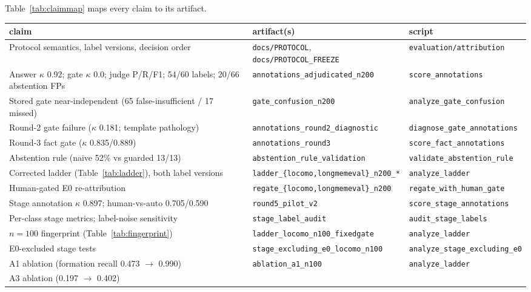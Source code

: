 \documentclass[11pt]{article}
\begin{document}
Table~\ref{tab:claimmap} maps every claim to its artifact.

\begin{table}[p]
\centering
\footnotesize
\setlength{\tabcolsep}{4pt}
\begin{tabular}{@{}p{6.0cm}p{5.4cm}p{4.0cm}@{}}
\toprule
claim & artifact(s) & script \\
\midrule
Protocol semantics, label versions, decision order &
\texttt{docs/PROTOCOL}, \texttt{docs/PROTOCOL\_FREEZE} &
\texttt{evaluation/attribution} \\
Answer $\kappa$ 0.92; gate $\kappa$ 0.0; judge P/R/F1; 54/60 labels; 20/66
abstention FPs & \texttt{annotations\_adjudicated\_n200} &
\texttt{score\_annotations} \\
Stored gate near-independent (65 false-insufficient / 17 missed) &
\texttt{gate\_confusion\_n200} & \texttt{analyze\_gate\_confusion} \\
Round-2 gate failure ($\kappa$ 0.181; template pathology) &
\texttt{annotations\_round2\_diagnostic} &
\texttt{diagnose\_gate\_annotations} \\
Round-3 fact gate ($\kappa$ 0.835/0.889) &
\texttt{annotations\_round3} & \texttt{score\_fact\_annotations} \\
Abstention rule (naive 52\% vs guarded 13/13) &
\texttt{abstention\_rule\_validation} & \texttt{validate\_abstention\_rule} \\
Corrected ladder (Table~\ref{tab:ladder}), both label versions &
\texttt{ladder\_\{locomo,longmemeval\}\_n200\_*} & \texttt{analyze\_ladder} \\
Human-gated E0 re-attribution &
\texttt{regate\_\{locomo,longmemeval\}\_n200} &
\texttt{regate\_with\_human\_gate} \\
Stage annotation $\kappa$ 0.897; human-vs-auto 0.705/0.590 &
\texttt{round5\_pilot\_v2} & \texttt{score\_stage\_annotations} \\
Per-class stage metrics; label-noise sensitivity &
\texttt{stage\_label\_audit} & \texttt{audit\_stage\_labels} \\
$n{=}100$ fingerprint (Table~\ref{tab:fingerprint}) &
\texttt{ladder\_locomo\_n100\_fixedgate} & \texttt{analyze\_ladder} \\
E0-excluded stage tests &
\texttt{stage\_excluding\_e0\_locomo\_n100} &
\texttt{analyze\_stage\_excluding\_e0} \\
A1 ablation (formation recall 0.473 $\to$ 0.990) &
\texttt{ablation\_a1\_n100} & \texttt{analyze\_ladder} \\
A3 ablation (0.197 $\to$ 0.402) &

\end{tabular}
\end{table}
\end{document}
